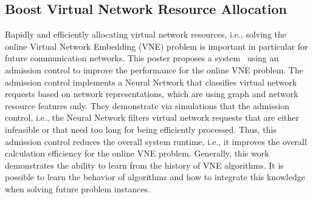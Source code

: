 




\subsection{Boost Virtual Network Resource Allocation}

Rapidly and efficiently allocating virtual network resources, i.e., solving
the online Virtual Network Embedding (VNE) problem is important in particular
for future communication networks. This poster proposes a system~\cite{ablenk:cnsm:2016} using an admission control to improve the performance
for the online VNE problem. The admission control implements a Neural Network
that classifies virtual network requests based on network representations,
which are using graph and network resource features only. They demonstrate via
simulations that the admission control, i.e., the Neural Network filters
virtual network requests that are either infeasible or that need too long for
being efficiently processed. Thus, this admission control reduces the overall
system runtime, i.e., it improves the overall calculation efficiency for the
online VNE problem.  Generally, this work demonstrates the ability to learn
from the history of VNE algorithms. It is possible to learn the behavior of
algorithms and how to integrate this knowledge when solving future problem
instances.

